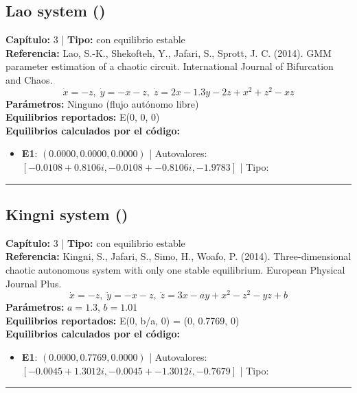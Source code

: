 \subsection*{Lao system ()}
\textbf{Capítulo:} 3 | \textbf{Tipo:} con equilibrio estable\\
\textbf{Referencia:} Lao, S.-K., Shekofteh, Y., Jafari, S., Sprott, J. C. (2014). GMM parameter estimation of a chaotic circuit. International Journal of Bifurcation and Chaos.\\
\[\dot{x}=-z, \; \dot{y}=-x-z, \; \dot{z}=2x-1.3y-2z+x^2+z^2-xz\]
\textbf{Parámetros:} Ninguno (flujo autónomo libre)\\
\textbf{Equilibrios reportados:} E(0, 0, 0)\\
\textbf{Equilibrios calculados por el código:}
\begin{itemize}
  \item \textbf{E1}: $(0.0000, 0.0000, 0.0000)$ | Autovalores: $[-0.0108 + 0.8106i, -0.0108 + -0.8106i, -1.9783]$ | Tipo: 
\end{itemize}
\hrule

\subsection*{Kingni system ()}
\textbf{Capítulo:} 3 | \textbf{Tipo:} con equilibrio estable\\
\textbf{Referencia:} Kingni, S., Jafari, S., Simo, H., Woafo, P. (2014). Three-dimensional chaotic autonomous system with only one stable equilibrium. European Physical Journal Plus.\\
\[\dot{x}=-z, \; \dot{y}=-x-z, \; \dot{z}=3x-ay+x^2-z^2-yz+b\]
\textbf{Parámetros:} $a = 1.3$, $b = 1.01$\\
\textbf{Equilibrios reportados:} E(0, b/a, 0) = (0, 0.7769, 0)\\
\textbf{Equilibrios calculados por el código:}
\begin{itemize}
  \item \textbf{E1}: $(0.0000, 0.7769, 0.0000)$ | Autovalores: $[-0.0045 + 1.3012i, -0.0045 + -1.3012i, -0.7679]$ | Tipo: 
\end{itemize}
\hrule

